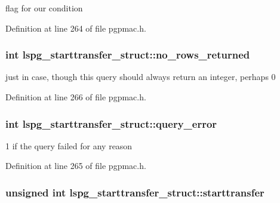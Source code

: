 flag for our condition 



Definition at line 264 of file pgpmac.\-h.

\hypertarget{structlspg__starttransfer__struct_aa384ccd326d9247317f77072b93f94ca}{
\subsubsection[{no\-\_\-rows\-\_\-returned}]{\setlength{\rightskip}{0pt plus 5cm}int lspg\-\_\-starttransfer\-\_\-struct\-::no\-\_\-rows\-\_\-returned}}\label{structlspg__starttransfer__struct_aa384ccd326d9247317f77072b93f94ca}


just in case, though this query should always return an integer, perhaps 0 



Definition at line 266 of file pgpmac.\-h.

\hypertarget{structlspg__starttransfer__struct_a5ef1d5a6708b3872761b86aef34d7aeb}{
\subsubsection[{query\-\_\-error}]{\setlength{\rightskip}{0pt plus 5cm}int lspg\-\_\-starttransfer\-\_\-struct\-::query\-\_\-error}}\label{structlspg__starttransfer__struct_a5ef1d5a6708b3872761b86aef34d7aeb}


1 if the query failed for any reason 



Definition at line 265 of file pgpmac.\-h.

\hypertarget{structlspg__starttransfer__struct_af01b6bac6db9830719aef63e552312eb}{
\subsubsection[{starttransfer}]{\setlength{\rightskip}{0pt plus 5cm}unsigned int lspg\-\_\-starttransfer\-\_\-struct\-::starttransfer}}\label{structlspg__starttransfer__struct_af01b6bac6db9830719aef63e552312eb}


